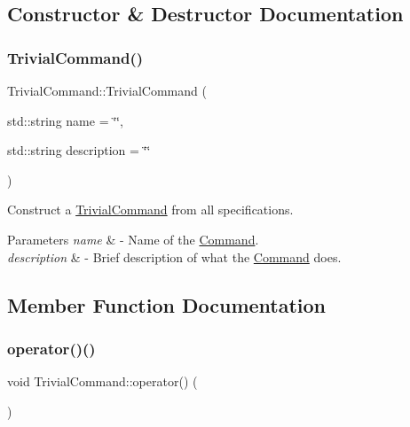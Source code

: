 \subsection{Constructor \& Destructor Documentation}
\mbox{\label{class_trivial_command_aa04f1b1e89d9b70d18abb1979f7a176f}} 
\subsubsection{\texorpdfstring{Trivial\+Command()}{TrivialCommand()}}
{\footnotesize\ttfamily Trivial\+Command\+::\+Trivial\+Command (\begin{DoxyParamCaption}\item[{std\+::string}]{name = {\ttfamily \char`\"{}\char`\"{}},  }\item[{std\+::string}]{description = {\ttfamily \char`\"{}\char`\"{}} }\end{DoxyParamCaption})\hspace{0.3cm}{\ttfamily [inline]}}

Construct a \mbox{\hyperlink{class_trivial_command}{Trivial\+Command}} from all specifications. 
\begin{DoxyParams}{Parameters}
{\em name} & -\/ Name of the \mbox{\hyperlink{class_command}{Command}}. \\
\hline
{\em description} & -\/ Brief description of what the \mbox{\hyperlink{class_command}{Command}} does. \\
\hline
\end{DoxyParams}


\subsection{Member Function Documentation}
\mbox{\label{class_trivial_command_aa61a3e5fd78d3a2dec6fcf6dcb2e5189}} 
\subsubsection{\texorpdfstring{operator()()}{operator()()}}
{\footnotesize\ttfamily void Trivial\+Command\+::operator() (\begin{DoxyParamCaption}{ }\end{DoxyParamCaption})\hspace{0.3cm}{\ttfamily [pure virtual]}}

